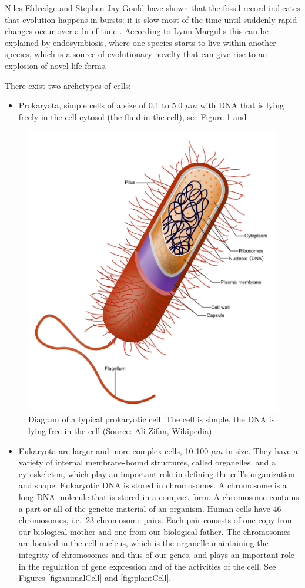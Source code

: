 \documentclass[
  11pt,
]{book}
\providecommand{\tightlist}{%
  \setlength{\itemsep}{0pt}\setlength{\parskip}{0pt}}
\begin{document}
Niles Eldredge and Stephen Jay Gould have shown that the fossil record indicates that evolution happens in bursts: it is slow most of the time until suddenly rapid changes occur over a brief time \citep{margulis1999}. According to Lynn Margulis this can be explained by endosymbiosis, where one species starts to live within another species, which is a source of evolutionary novelty that can give rise to an explosion of novel life forms.

There exist two archetypes of cells:

\begin{itemize}
\tightlist
\item
  Prokaryota, simple cells of a size of 0.1 to 5.0 \(\mu m\) with DNA that is lying freely in the cell cytosol (the fluid in the cell), see Figure \ref{fig:prokaryotaCell} and
\end{itemize}

\begin{figure}

{\centering \includegraphics[width=0.5\linewidth]{./figs/prokaryoteCell} 

}

\caption{Diagram of a typical prokaryotic cell. The cell is simple, the DNA is lying free in the cell (Source: Ali Zifan, Wikipedia)}\label{fig:prokaryotaCell}
\end{figure}

\begin{itemize}
\tightlist
\item
  Eukaryota are larger and more complex cells, 10-100 \(\mu m\) in size. They have a variety of internal membrane-bound structures, called organelles, and a cytoskeleton, which play an important role in defining the cell's organization and shape. Eukaryotic DNA is stored in chromosomes. A chromosome is a long DNA molecule that is stored in a compact form. A chromosome contains a part or all of the genetic material of an organism. Human cells have 46 chromosomes, i.e.~23 chromosome pairs. Each pair consists of one copy from our biological mother and one from our biological father. The chromosomes are located in the cell nucleus, which is the organelle maintaining the integrity of chromosomes and thus of our genes, and plays an important role in the regulation of gene expression and of the activities of the cell. See Figures \ref{fig:animalCell} and \ref{fig:plantCell}.
\end{itemize}
\end{document}
